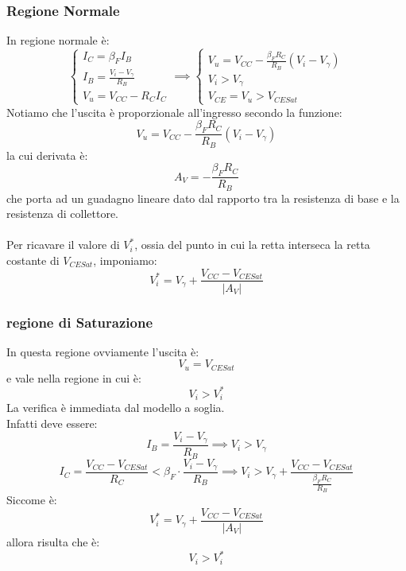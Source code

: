 \documentclass[../main.tex]{subfiles}
\begin{document}
	\subsubsection{Regione Normale}
	In regione normale è:
	$$\begin{cases} I_C = \beta_F I_B \\ I_B = \frac{V_i - V_\gamma}{R_B} \\ V_u = V_{CC} - R_C I_C \end{cases} \implies \begin{cases} V_u = V_{CC} - \frac{\beta_F R_C}{R_B} (V_i - V_\gamma) \\ V_i > V_\gamma \\ V_{CE} = V_u > V_{CESat} \end{cases}$$
	Notiamo che l’uscita è proporzionale all’ingresso secondo la funzione:
	$$V_u = V_{CC} - \frac{\beta_F R_C}{R_B} (V_i - V_\gamma)$$
	la cui derivata è:
	$$A_V = -\frac{\beta_F R_C}{R_B}$$
	che porta ad un guadagno lineare dato dal rapporto tra la resistenza di base e la resistenza di collettore.\\\\
	Per ricavare il valore di $V_i^*$, ossia del punto in cui la retta interseca la retta costante di $V_{CESat}$, imponiamo:
	$$V_i^* = V_\gamma + \frac{V_{CC} - V_{CESat}}{|A_V|}$$
	\subsubsection{regione di Saturazione}
	In questa regione ovviamente l’uscita è:
	$$V_u = V_{CESat}$$
	e vale nella regione in cui è:
	$$V_i > V_i^*$$
	La verifica è immediata dal modello a soglia. \\
	Infatti deve essere:
	$$I_B = \frac{V_i - V_\gamma}{R_B} \implies V_i > V_\gamma$$
	$$I_C = \frac{V_{CC} - V_{CESat}}{R_C} < \beta_F \cdot \frac{V_i - V_\gamma}{R_B} \implies V_i > V_\gamma + \frac{V_{CC} - V_{CESat}}{\frac{\beta_F R_C}{R_B}}$$
	Siccome è:
	$$V_i^* = V_\gamma + \frac{V_{CC} - V_{CESat}}{|A_V|}$$
	allora risulta che è:
	$$V_i > V_i^*$$
\end{document}
